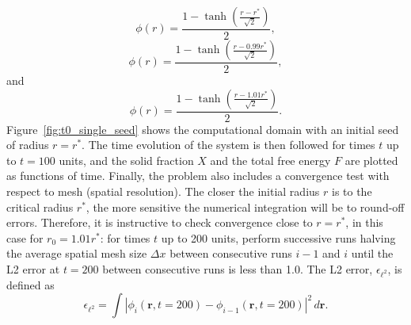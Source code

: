 \documentclass[preprint,12pt]{elsarticle}
\begin{document}
\begin{equation}
    \phi(r)=\frac{1-\tanh\left(
    \frac{r-r^*}{\sqrt{2}}
    \right)}{2},
    \label{eqn:phitr_2}
\end{equation}
\begin{equation}
    \phi(r)=\frac{1-\tanh\left(
    \frac{r-0.99r^*}{\sqrt{2}}
    \right)}{2},
    \label{eqn:phitr_3}
\end{equation}
and 
\begin{equation}
    \phi(r)=\frac{1-\tanh\left(
    \frac{r-1.01r^*}{\sqrt{2}}
    \right)}{2}.
    \label{eqn:phitr_4}
\end{equation}
%
Figure~\ref{fig:t0_single_seed} shows the computational domain with an initial seed of radius $r=r^*$. The time evolution of the system is then followed for times $t$ up to $t = 100$ units, and the solid fraction $X$ and the total free energy $F$ are plotted as functions of time. Finally, the problem also includes a convergence test with respect to mesh (spatial resolution). The closer the initial radius $r$ is to the critical radius $r^*$, the more sensitive the numerical integration will be to round-off errors. Therefore, it is instructive to check convergence close to $r=r^*$, in this case for $r_0=1.01r^*$: for times $t$ up to 200 units, perform successive runs halving the average spatial mesh size $\Delta x$ between consecutive runs $i-1$ and $i$ until the L2 error at $t=200$ between consecutive runs is less than 1.0. The L2 error, $\epsilon_{\ell^2}$, is defined as
\begin{equation}
    \epsilon_{\ell^2}=\int\left|\phi_i(\mathbf{r},t=200)-\phi_{i-1}(\mathbf{r},t=200)\right|^2\,d\mathbf{r}.
    \label{eqn:L2}
\end{equation}
\end{document}
